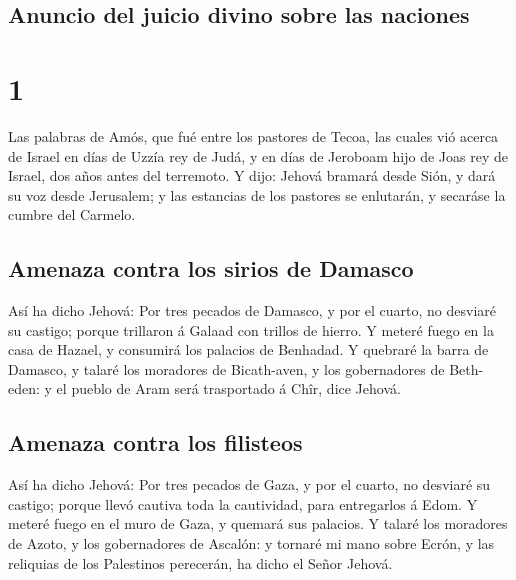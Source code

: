 \hypertarget{anuncio-del-juicio-divino-sobre-las-naciones}{%
\subsection{Anuncio del juicio divino sobre las
naciones}\label{anuncio-del-juicio-divino-sobre-las-naciones}}

\hypertarget{section-30-1}{%
\section{1}\label{section-30-1}}

 Las palabras de Amós, que fué entre los pastores de
Tecoa, las cuales vió acerca de Israel en días de Uzzía rey de Judá, y
en días de Jeroboam hijo de Joas rey de Israel, dos años antes del
terremoto.  Y dijo: Jehová bramará desde Sión, y dará su
voz desde Jerusalem; y las estancias de los pastores se enlutarán, y
secaráse la cumbre del Carmelo.

\hypertarget{amenaza-contra-los-sirios-de-damasco}{%
\subsection{Amenaza contra los sirios de
Damasco}\label{amenaza-contra-los-sirios-de-damasco}}

 Así ha dicho Jehová: Por tres pecados de Damasco, y por
el cuarto, no desviaré su castigo; porque trillaron á Galaad con trillos
de hierro.  Y meteré fuego en la casa de Hazael, y
consumirá los palacios de Benhadad.  Y quebraré la barra
de Damasco, y talaré los moradores de Bicath-aven, y los gobernadores de
Beth-eden: y el pueblo de Aram será trasportado á Chîr, dice Jehová.

\hypertarget{amenaza-contra-los-filisteos}{%
\subsection{Amenaza contra los
filisteos}\label{amenaza-contra-los-filisteos}}

 Así ha dicho Jehová: Por tres pecados de Gaza, y por el
cuarto, no desviaré su castigo; porque llevó cautiva toda la cautividad,
para entregarlos á Edom.  Y meteré fuego en el muro de
Gaza, y quemará sus palacios.  Y talaré los moradores de
Azoto, y los gobernadores de Ascalón: y tornaré mi mano sobre Ecrón, y
las reliquias de los Palestinos perecerán, ha dicho el Señor Jehová.

